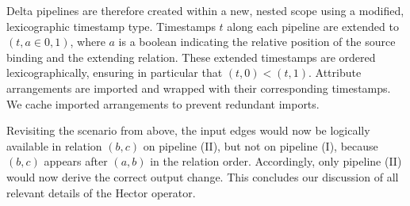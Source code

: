 \documentclass[../index.tex]{subfiles}
\begin{document}
Delta pipelines are therefore created within a new, nested scope using
a modified, lexicographic timestamp type. Timestamps $t$ along each
pipeline are extended to $(t,a \in {0,1})$, where $a$ is a boolean
indicating the relative position of the source binding and the
extending relation. These extended timestamps are ordered
lexicographically, ensuring in particular that $(t,0) <
(t,1)$. Attribute arrangements are imported and wrapped with their
corresponding timestamps. We cache imported arrangements to prevent
redundant imports.

Revisiting the scenario from above, the input edges would now be
logically available in relation $(b,c)$ on pipeline (II), but not on
pipeline (I), because $(b,c)$ appears after $(a,b)$ in the relation
order. Accordingly, only pipeline (II) would now derive the correct
output change. This concludes our discussion of all relevant details
of the Hector operator.
\end{document}
